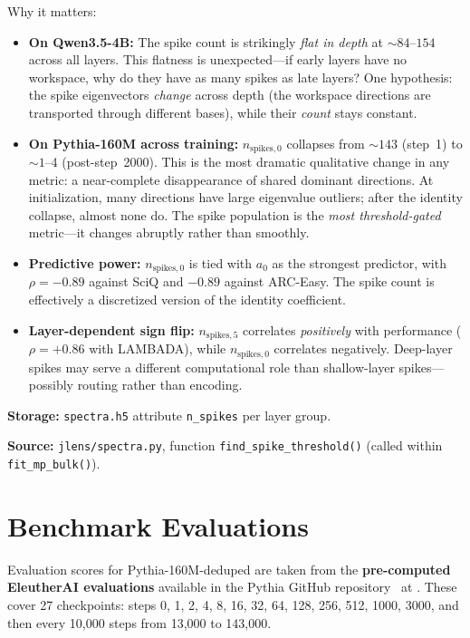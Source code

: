 \documentclass[11pt,a4paper]{article}
\begin{document}
Why it matters:
\begin{itemize}
  \item \textbf{On Qwen3.5-4B:} The spike count is strikingly \emph{flat in depth} at $\sim 84$--$154$ across all layers. This flatness is unexpected---if early layers have no workspace, why do they have as many spikes as late layers? One hypothesis: the spike eigenvectors \emph{change} across depth (the workspace directions are transported through different bases), while their \emph{count} stays constant.
  \item \textbf{On Pythia-160M across training:} $n_{\text{spikes},0}$ collapses from $\sim 143$ (step~1) to $\sim 1$--4 (post-step~2000). This is the most dramatic qualitative change in any metric: a near-complete disappearance of shared dominant directions. At initialization, many directions have large eigenvalue outliers; after the identity collapse, almost none do. The spike population is the \emph{most threshold-gated} metric---it changes abruptly rather than smoothly.
  \item \textbf{Predictive power:} $n_{\text{spikes},0}$ is tied with $a_0$ as the strongest predictor, with $\rho = -0.89$ against SciQ and $-0.89$ against ARC-Easy. The spike count is effectively a discretized version of the identity coefficient.
  \item \textbf{Layer-dependent sign flip:} $n_{\text{spikes},5}$ correlates \emph{positively} with performance ($\rho = +0.86$ with LAMBADA), while $n_{\text{spikes},0}$ correlates negatively. Deep-layer spikes may serve a different computational role than shallow-layer spikes---possibly routing rather than encoding.
\end{itemize}

\textbf{Storage:} \texttt{spectra.h5} attribute \texttt{n\_spikes} per layer group.

\textbf{Source:} \texttt{jlens/spectra.py}, function \texttt{find\_spike\_threshold()} (called within \texttt{fit\_mp\_bulk()}).

\section{Benchmark Evaluations}

Evaluation scores for Pythia-160M-deduped are taken from the \textbf{pre-computed EleutherAI evaluations} available in the Pythia GitHub repository~\cite{pythia-evals} at . These cover 27 checkpoints: steps 0, 1, 2, 4, 8, 16, 32, 64, 128, 256, 512, 1000, 3000, and then every 10,000 steps from 13,000 to 143,000.
\end{document}
